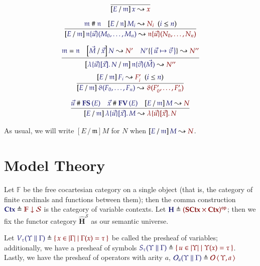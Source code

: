 \documentclass[11pt]{article}
\theoremstyle{definition}
\theoremstyle{remark}
\numberwithin{equation}{section}
\def\IModeColorName{MidnightBlue}
\def\OModeColorName{Maroon}
\newcommand\IMode[1]{{\color{\IModeColorName}{#1}}}
\newcommand\OMode[1]{{\color{\OModeColorName}{#1}}}
\newcommand\HypJ[2]{#1\ \ (#2)}
\newcommand\MkSet[1]{\left\{\,#1\,\right\}}
\newcommand\MkBTm[3]{\mathbb{\lambda}\{#1\}[#2].\, #3}
\newcommand\Leq[2]{\IMode{#1}\leq\IMode{#2}}
\newcommand\FinSets{\mathbb{F}}
\newcommand\Sorts{\mathcal{S}}
\newcommand\Operators{\mathcal{O}}
\newcommand\SCtx{\mathbf{SCtx}}
\newcommand\Ctx{\mathbf{Ctx}}
\newcommand\HypCat{\mathbf{H}}
\newcommand\OpCat[1]{#1^{\mathtt{op}}}
\newcommand\Pair[2]{\left\langle\,#1,#2\,\right\rangle}
\newcommand\Comma[2]{#1 \downarrow#2}
\newcommand\MV[1]{\mathfrak{#1}}
\newcommand\MApp[3]{#1\{#2\}(#3)}
\newcommand\App[2]{#1(#2)}
\newcommand\Dom[1]{\left\vert#1\right\vert}
\newcommand\FV[1]{\mathbf{FV}\left(#1\right)}
\newcommand\FS[1]{\mathbf{FS}\left(#1\right)}
\newcommand\Rename[2]{%
  #2\{#1\}%
}
\newcommand\IsRenaming[3]{%
  \Rename{\IMode{#1}}{\IMode{#2}}%
  \leadsto\OMode{#3}%
}
\newcommand\Subst[3]{%
  \left[#1\, /\, #2\right]#3%
}
\newcommand\IsSubst[4]{%
  \Subst{\IMode{#1}}{\IMode{#2}}{\IMode{#3}}%
  \leadsto\OMode{#4}%
}
\newcommand\IsEq[2]{\IMode{#1} = \IMode{#2}}
\newcommand\IsApart[2]{\IMode{#1} \mathrel{\#} \IMode{#2}}
\newcommand\Define[2]{\IMode{#1}\triangleq\OMode{#2}}
\begin{document}
\begin{gather*}
  \infer{
    \IsSubst{E}{\MV{m}}{x}{x}
  }{
  }
\\[6pt]
  \infer{
    \IsSubst{E}{\MV{m}}{
      \MApp{\MV{n}}{\vec{u}}{M_0,\dots,M_n}
    }{
      \MApp{\MV{n}}{\vec{u}}{N_0,\dots,N_n}
    }
  }{
    \IsApart{\MV{m}}{\MV{n}}
&
    \HypJ{
      \IsSubst{E}{\MV{n}}{M_i}{N_i}
    }{
      \Leq{i}{n}
    }
  }
\\[6pt]
  \infer{
    \IsSubst{
      \MkBTm{\vec{u}}{\vec{x}}{N}
    }{\MV{m}}{
      \MApp{\MV{n}}{\vec{v}}{\vec{M}}
    }{
      N''
    }
  }{
    \IsEq{\MV{m}}{\MV{n}}
&
    \IsSubst{\vec{M}}{\vec{x}}{N}{N'}
&
    \IsRenaming{\MkSet{\vec{u}\mapsto\vec{v}}}{N'}{N''}
  }
\end{gather*}
\begin{gather*}
  \infer{
    \IsSubst{E}{\MV{m}}{
      \App{\vartheta}{F_0,\dots,F_n}
    }{
      \App{\vartheta}{F'_0,\dots,F'_n}
    }
  }{
    \HypJ{
      \IsSubst{E}{\MV{m}}{F_i}{F'_i}
    }{
      \Leq{i}{n}
    }
  }
\\[6pt]
  \infer{
    \IsSubst{E}{\MV{m}}{
      \MkBTm{\vec{u}}{\vec{x}}{M}
    }{
      \MkBTm{\vec{u}}{\vec{x}}{N}
    }
  }{
    \IsApart{\vec{u}}{\FS{E}}
&
    \IsApart{\vec{x}}{\FV{E}}
&
    \IsSubst{E}{\MV{m}}{M}{N}
  }
\end{gather*}

As usual, we will write $\Subst{E}{\MV{m}}{M}$ for $N$ when
$\IsSubst{E}{\MV{m}}{M}{N}$.

\section{Model Theory}

Let $\FinSets$ be the free cocartesian category on a single object (that is, the
category of finite cardinals and functions between them); then the comma
construction $\Define{\Ctx}{\Comma{\FinSets}{\Sorts}}$ is the category of
variable contexts. Let $\Define{\HypCat}{\OpCat{(\SCtx\times\Ctx)}}$; then we
fix the functor category $\widehat{\HypCat}^\Sorts$ as our semantic universe.

Let $\Define{V_\tau(\Upsilon\parallel\Gamma)}{\MkSet{x\in\Dom\Gamma\mid
    \Gamma(x)=\tau}}$ be called the presheaf of variables; additionally, we have
a presheaf of symbols
$\Define{S_\tau(\Upsilon\parallel\Gamma)}{\MkSet{u\in\Dom\Upsilon\mid
    \Upsilon(x)=\tau}}$. Lastly, we have the presheaf of operators with arity
$a$,
$\Define{\Operators_a(\Upsilon\parallel\Gamma)}{\Operators\Pair{\Upsilon}{a}}$
\end{document}
